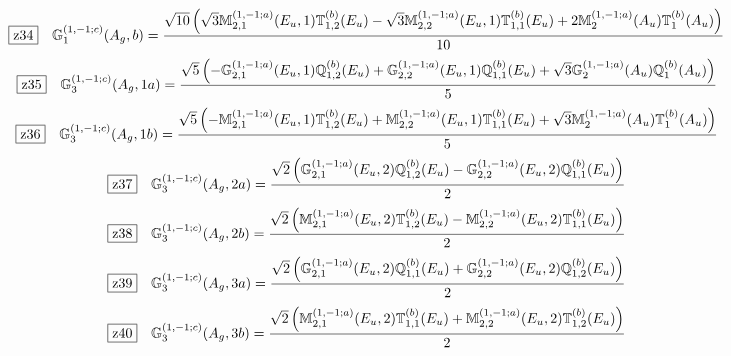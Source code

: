 \documentclass[fleqn,10pt,landscape]{jsarticle}
\begin{document}
\begin{dmath*}
\hspace*{3mm}\fbox{z34}\quad \mathbb{G}_{1}^{(1,-1;c)}(A_{g},b)=\frac{\sqrt{10} \left(\sqrt{3} \mathbb{M}_{2,1}^{(1,-1;a)}(E_{u},1) \mathbb{T}_{1,2}^{(b)}(E_{u}) - \sqrt{3} \mathbb{M}_{2,2}^{(1,-1;a)}(E_{u},1) \mathbb{T}_{1,1}^{(b)}(E_{u}) + 2 \mathbb{M}_{2}^{(1,-1;a)}(A_{u}) \mathbb{T}_{1}^{(b)}(A_{u})\right)}{10}
\end{dmath*}
\begin{dmath*}
\hspace*{3mm}\fbox{z35}\quad \mathbb{G}_{3}^{(1,-1;c)}(A_{g},1a)=\frac{\sqrt{5} \left(- \mathbb{G}_{2,1}^{(1,-1;a)}(E_{u},1) \mathbb{Q}_{1,2}^{(b)}(E_{u}) + \mathbb{G}_{2,2}^{(1,-1;a)}(E_{u},1) \mathbb{Q}_{1,1}^{(b)}(E_{u}) + \sqrt{3} \mathbb{G}_{2}^{(1,-1;a)}(A_{u}) \mathbb{Q}_{1}^{(b)}(A_{u})\right)}{5}
\end{dmath*}
\begin{dmath*}
\hspace*{3mm}\fbox{z36}\quad \mathbb{G}_{3}^{(1,-1;c)}(A_{g},1b)=\frac{\sqrt{5} \left(- \mathbb{M}_{2,1}^{(1,-1;a)}(E_{u},1) \mathbb{T}_{1,2}^{(b)}(E_{u}) + \mathbb{M}_{2,2}^{(1,-1;a)}(E_{u},1) \mathbb{T}_{1,1}^{(b)}(E_{u}) + \sqrt{3} \mathbb{M}_{2}^{(1,-1;a)}(A_{u}) \mathbb{T}_{1}^{(b)}(A_{u})\right)}{5}
\end{dmath*}
\begin{dmath*}
\hspace*{3mm}\fbox{z37}\quad \mathbb{G}_{3}^{(1,-1;c)}(A_{g},2a)=\frac{\sqrt{2} \left(\mathbb{G}_{2,1}^{(1,-1;a)}(E_{u},2) \mathbb{Q}_{1,2}^{(b)}(E_{u}) - \mathbb{G}_{2,2}^{(1,-1;a)}(E_{u},2) \mathbb{Q}_{1,1}^{(b)}(E_{u})\right)}{2}
\end{dmath*}
\begin{dmath*}
\hspace*{3mm}\fbox{z38}\quad \mathbb{G}_{3}^{(1,-1;c)}(A_{g},2b)=\frac{\sqrt{2} \left(\mathbb{M}_{2,1}^{(1,-1;a)}(E_{u},2) \mathbb{T}_{1,2}^{(b)}(E_{u}) - \mathbb{M}_{2,2}^{(1,-1;a)}(E_{u},2) \mathbb{T}_{1,1}^{(b)}(E_{u})\right)}{2}
\end{dmath*}
\begin{dmath*}
\hspace*{3mm}\fbox{z39}\quad \mathbb{G}_{3}^{(1,-1;c)}(A_{g},3a)=\frac{\sqrt{2} \left(\mathbb{G}_{2,1}^{(1,-1;a)}(E_{u},2) \mathbb{Q}_{1,1}^{(b)}(E_{u}) + \mathbb{G}_{2,2}^{(1,-1;a)}(E_{u},2) \mathbb{Q}_{1,2}^{(b)}(E_{u})\right)}{2}
\end{dmath*}
\begin{dmath*}
\hspace*{3mm}\fbox{z40}\quad \mathbb{G}_{3}^{(1,-1;c)}(A_{g},3b)=\frac{\sqrt{2} \left(\mathbb{M}_{2,1}^{(1,-1;a)}(E_{u},2) \mathbb{T}_{1,1}^{(b)}(E_{u}) + \mathbb{M}_{2,2}^{(1,-1;a)}(E_{u},2) \mathbb{T}_{1,2}^{(b)}(E_{u})\right)}{2}
\end{dmath*}
\end{document}
